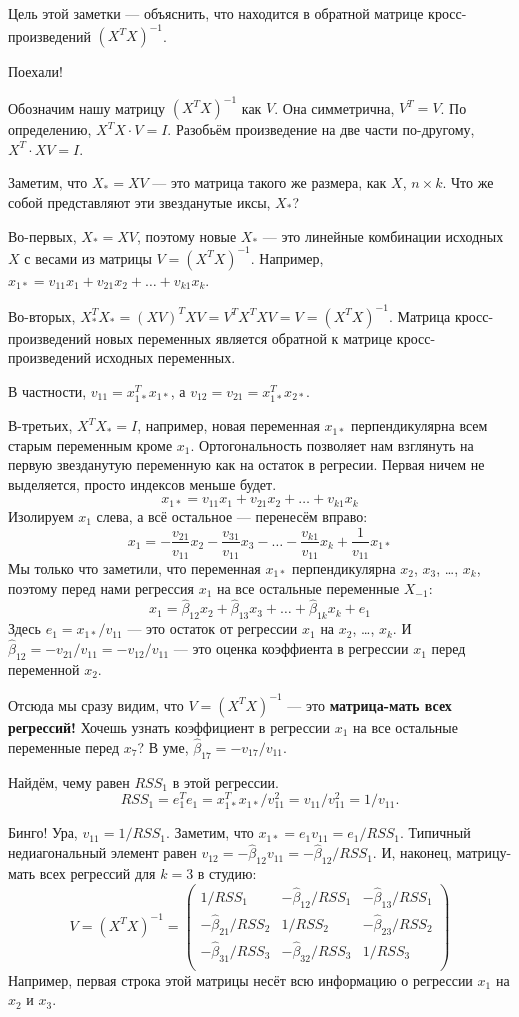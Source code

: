\documentclass[12pt]{article}
\newcommand{\hb}{\hat{\beta}}
\begin{document}
Цель этой заметки — объяснить, что находится в обратной матрице кросс-произведений $(X^TX)^{-1}$.

Поехали! 

Обозначим нашу матрицу $(X^TX)^{-1}$ как $V$. Она симметрична, $V^T = V$. 
По определению, $X^TX \cdot V = I$.
Разобьём произведение на две части по-другому, $X^T \cdot XV = I$.

Заметим, что $X_* = XV$ — это матрица такого же размера, как $X$, $n\times k$. 
Что же собой представляют эти звезданутые иксы, $X_*$?

Во-первых, $X_* = XV$, поэтому новые $X_*$ — это линейные комбинации исходных $X$ с весами из матрицы $V = (X^TX)^{-1}$.
Например, $x_{1*} = v_{11} x_1 + v_{21} x_2 + \dots + v_{k1} x_k$.

Во-вторых, $X_*^T X_* = (X V)^T   X V = V^T X^TX V = V = (X^TX)^{-1}$. 
Матрица кросс-произведений новых переменных является обратной к матрице кросс-произведений исходных переменных. 

В частности, $v_{11} = x_{1*}^T x_{1*}$, а $v_{12} = v_{21} = x_{1*}^T x_{2*}$.

В-третьих, $X^TX_* = I$, например, новая переменная $x_{1*}$ перпендикулярна всем старым переменным кроме $x_1$.
Ортогональность позволяет нам взглянуть на первую звезданутую переменную как на остаток в регресии.
Первая ничем не выделяется, просто индексов меньше будет.
\[
x_{1*} = v_{11} x_1 + v_{21} x_2 + \dots + v_{k1} x_k 
\]
Изолируем $x_1$ слева, а всё остальное — перенесём вправо:
\[
x_1 = -\frac{v_{21}}{v_{11}} x_2  -\frac{v_{31}}{v_{11}} x_3 - \dots -\frac{v_{k1}}{v_{11}} x_k + \frac{1}{v_{11}} x_{1*} 
\]
Мы только что заметили, что переменная $x_{1*}$ перпендикулярна $x_2$, $x_3$, \dots, $x_k$, поэтому перед нами регрессия $x_1$ на все остальные переменные $X_{-1}$:
\[
x_1 = \hb_{12} x_2 + \hb_{13} x_3 + \dots + \hb_{1k} x_k + e_1
\]
Здесь $e_1 = x_{1*} /v_{11}$ — это остаток от регрессии $x_1$ на $x_2$, \dots, $x_k$.
И $\hb_{12} = -{v_{21}}/{v_{11}} = -{v_{12}}/{v_{11}}$ — это оценка коэффиента в регрессии $x_1$ перед переменной $x_2$.

Отсюда мы сразу видим, что $V = (X^TX)^{-1}$ — это \textbf{матрица-мать всех регрессий!}
Хочешь узнать коэффициент в регрессии $x_1$ на все остальные переменные перед $x_7$?
В уме, $\hb_{17} = - v_{17} / v_{11}$.


Найдём, чему равен $RSS_1$ в этой регрессии.
\[
RSS_1 = e_1^T e_1 = x_{1*}^T x_{1*} / v_{11}^2  = v_{11} / v_{11}^2 = 1  / v_{11}.
\]

Бинго! Ура, $v_{11} = 1/ RSS_1$. 
Заметим, что $x_{1*} = e_1 v_{11} = e_1/RSS_1$.
Типичный недиагональный элемент равен $v_{12} = -\hb_{12} v_{11} = -\hb_{12}/RSS_1$.
И, наконец, матрицу-мать всех регрессий для $k=3$ в студию:
\[
V = (X^TX)^{-1} = \begin{pmatrix}
    1/RSS_1 & -{\hb_{12}}/{RSS_1} & -{\hb_{13}}/{RSS_1}\\
    - {\hb_{21}}/{RSS_2} & 1/RSS_2 & - {\hb_{23}}/{RSS_2} \\
    - {\hb_{31}}/{RSS_3}  & - {\hb_{32}}/{RSS_3} & 1/RSS_3 \\
\end{pmatrix} 
\]
Например, первая строка этой матрицы несёт всю информацию о регрессии $x_1$ на $x_2$ и $x_3$.
\end{document}
